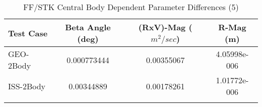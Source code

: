 \begin{table}[htbp!]
\centering
\caption{ FF/STK Central Body Dependent Parameter Differences (5)}
      \begin{tabular}{lccc}
      \hline\hline
          Test Case & Beta Angle (deg) & (RxV)-Mag ($m^2/sec$) & R-Mag (m) \\
         \hline
         GEO-2Body & 0.000773444 & 0.00355067 & 4.05998e-006 \\
         ISS-2Body & 0.00344889 & 0.00178261 & 1.01772e-006 \\
      \hline\hline
      \label{Table: FF-STK CB Parameters Set 5} 
\end{tabular}
\end{table}
